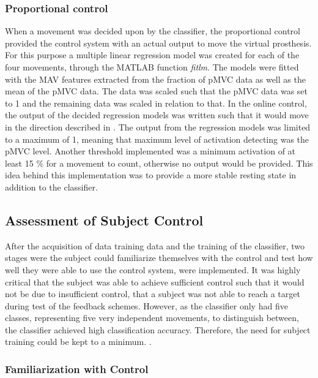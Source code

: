 \subsubsection{Proportional control}  
When a movement was decided upon by the classifier, the proportional control provided the control system with an actual output to move the virtual prosthesis. For this purpose a multiple linear regression model was created for each of the four movements, through the MATLAB function \textit{fitlm}. The models were fitted with the MAV features extracted from the fraction of pMVC data as well as the mean of the pMVC data. The data was scaled such that the pMVC data was set to 1 and the remaining data was scaled in relation to that. In the online control, the output of the decided regression models was written such that it would move in the direction described in . The output from the regression models was limited to a maximum of 1, meaning that maximum level of activation detecting was the pMVC level.  Another threshold implemented was a minimum activation of at least 15 $\percent$ for a movement to count, otherwise no output would be provided. This idea behind this implementation was to provide a more stable resting state in addition to the classifier. 



\subsection{Assessment of Subject Control}

After the acquisition of data training data and the training of the classifier, two stages were the subject could familiarize themselves with the control and test how well they were able to use the control system, were implemented. It was highly critical that the subject was able to achieve sufficient control such that it would not be due to insufficient control, that a subject was not able to reach a target during test of the feedback schemes. However, as the classifier only had five classes, representing five very independent movements, to distinguish between, the classifier achieved high classification accuracy. Therefore, the need for subject training could be kept to a minimum. .  

\subsubsection{Familiarization with Control}

